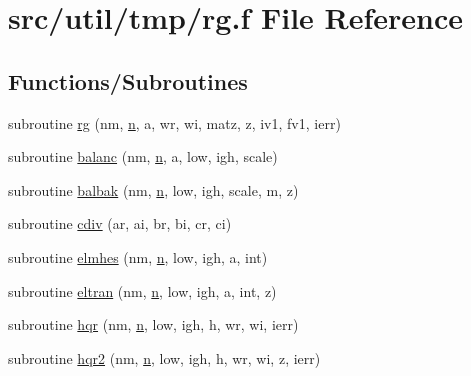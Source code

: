 \hypertarget{tmp_2rg_8f}{
\section{src/util/tmp/rg.f File Reference}
\label{tmp_2rg_8f}
}
\subsection*{Functions/Subroutines}
\begin{DoxyCompactItemize}
\item 
subroutine \hyperlink{tmp_2rg_8f_a8942cae6319671cdf7ba91a0ba689cc9}{rg} (nm, \hyperlink{time_8com_ae2924ded6f091682ae95d5e9c68e516c}{n}, a, wr, wi, matz, z, iv1, fv1, ierr)
\item 
subroutine \hyperlink{tmp_2rg_8f_aba120d9bbf60938700210c16106cdf2f}{balanc} (nm, \hyperlink{time_8com_ae2924ded6f091682ae95d5e9c68e516c}{n}, a, low, igh, scale)
\item 
subroutine \hyperlink{tmp_2rg_8f_a88904eee0d26b87d49e5ff3f8f4fa6d1}{balbak} (nm, \hyperlink{time_8com_ae2924ded6f091682ae95d5e9c68e516c}{n}, low, igh, scale, m, z)
\item 
subroutine \hyperlink{tmp_2rg_8f_a0a5595f19cd351dc283c4be4ffd1096e}{cdiv} (ar, ai, br, bi, cr, ci)
\item 
subroutine \hyperlink{tmp_2rg_8f_a721848a66951298977535e93e3ad353b}{elmhes} (nm, \hyperlink{time_8com_ae2924ded6f091682ae95d5e9c68e516c}{n}, low, igh, a, int)
\item 
subroutine \hyperlink{tmp_2rg_8f_a3937bdfec6d2fc2a7c998388d12eab4f}{eltran} (nm, \hyperlink{time_8com_ae2924ded6f091682ae95d5e9c68e516c}{n}, low, igh, a, int, z)
\item 
subroutine \hyperlink{tmp_2rg_8f_a629b9c03a461254bd4d5b1c36efbc2dd}{hqr} (nm, \hyperlink{time_8com_ae2924ded6f091682ae95d5e9c68e516c}{n}, low, igh, h, wr, wi, ierr)
\item 
subroutine \hyperlink{tmp_2rg_8f_ae4440094f77fe6b409524b1c869bedb9}{hqr2} (nm, \hyperlink{time_8com_ae2924ded6f091682ae95d5e9c68e516c}{n}, low, igh, h, wr, wi, z, ierr)
\end{DoxyCompactItemize}


